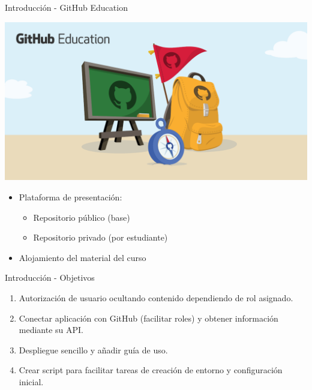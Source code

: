 \documentclass{beamer}
\begin{document}
        \begin{frame}{Introducción - GitHub Education}
            \begin{center}
            	\includegraphics[width=.55\textwidth]{Presentacion/introduccion/githubedu.png}
                \begin{itemize}
                    \item Plataforma de presentación:
                    \begin{itemize}
                        \item Repositorio público (base)
                        \item Repositorio privado (por estudiante)
                    \end{itemize}
                    \item Alojamiento del material del curso
                \end{itemize}
            \end{center} 
            
        \end{frame}

        \begin{frame}{Introducción - Objetivos}
            \begin{enumerate}
                \item Autorización de usuario ocultando contenido dependiendo de rol asignado.
                \item Conectar aplicación con GitHub (facilitar roles) y obtener información mediante su API.
                \item Despliegue sencillo y añadir guía de uso.
                \item Crear script para facilitar tareas de creación de entorno y configuración inicial.
            \end{enumerate}            
        \end{frame}
    	
\end{document}
